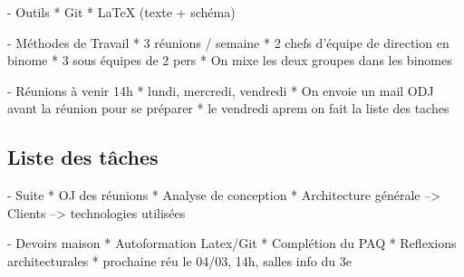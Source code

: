 \documentclass[11pt,fleqn]{report}
\begin{document}
- Outils
  * Git
  * LaTeX (texte + schéma)
  
- Méthodes de Travail
  * 3 réunions / semaine
  * 2 chefs d'équipe de direction en binome
  * 3 sous équipes de 2 pers
  * On mixe les deux groupes dans les binomes

- Réunions à venir 14h 
  * lundi, mercredi, vendredi
  * On envoie un mail ODJ avant la réunion pour se préparer
  * le vendredi aprem on fait la liste des taches

\subsection{Liste des tâches}
  - Suite
    * OJ des réunions
    * Analyse de conception
    * Architecture générale --> Clients --> technologies utilisées
  
  - Devoirs maison
    * Autoformation Latex/Git
    * Complétion du PAQ
    * Reflexions architecturales
    * prochaine réu le 04/03, 14h, salles info du 3e
\end{document}
